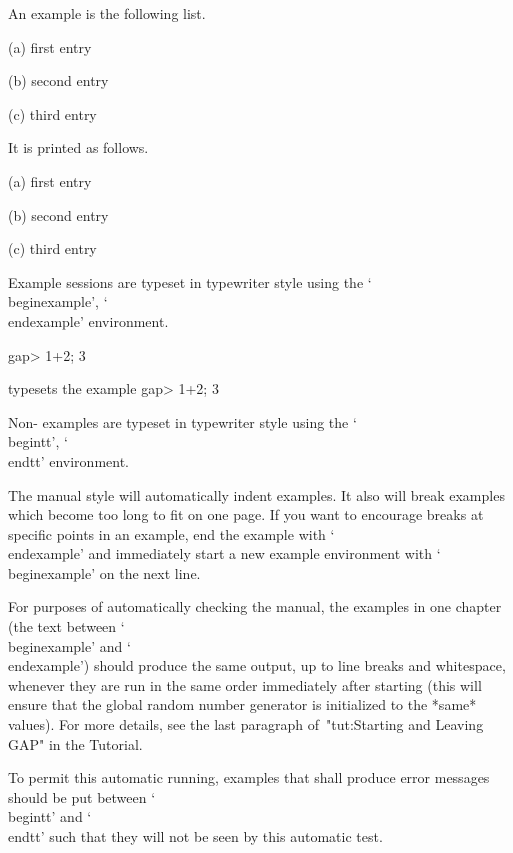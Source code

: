 An example is the following list.

\begintt
\beginlist
\item{(a)}
    first entry
\item{(b)}
    second entry
\item{(c)}
    third entry
\endlist
\endtt

It is printed as follows.
\beginlist
\item{(a)}
    first entry
\item{(b)}
    second entry
\item{(c)}
    third entry
\endlist

Example {\GAP} sessions are typeset in typewriter style
using the `\\beginexample', `\\endexample' environment.

\begintt
\beginexample
gap> 1+2;
3
\endexample
\endtt

typesets the example
\beginexample
gap> 1+2;
3
\endexample

Non-{\GAP} examples are typeset in typewriter style
using the `\\begintt', `\\endtt' environment.

The manual style will automatically indent examples. It also will break
examples which become too long to fit on one page. If you want to encourage
breaks at specific points in an example, end the example with `\\endexample'
and immediately start a new example environment with `\\beginexample' on
the next line.


For purposes of automatically checking the manual,
the {\GAP} examples in one chapter (the text between `\\beginexample'
and `\\endexample') should produce the same output, up to line breaks
and whitespace, whenever they are run in the same order
immediately after starting {\GAP}
(this will ensure that the global random number generator is initialized
to the *same* values).
For more details,
see the last paragraph of~"tut:Starting and Leaving GAP" in the Tutorial.

To permit this automatic running,
examples that shall produce error messages should be put between
`\\begintt' and `\\endtt'
such that they will not be seen by this automatic test.

